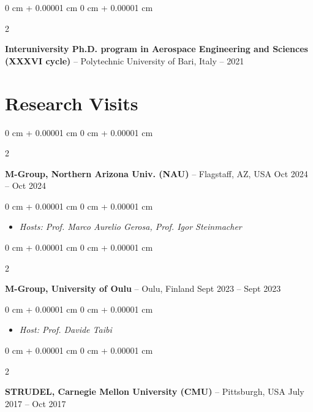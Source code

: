 \documentclass[10pt, a4paper]{article}
\newenvironment{highlights}{
    \begin{itemize}[
        topsep=0.10 cm,
        parsep=0.10 cm,
        partopsep=0pt,
        itemsep=0pt,
        leftmargin=0 cm + 10pt
    ]
}{
    \end{itemize}
} %
\newenvironment{onecolentry}{
    \begin{adjustwidth}{
        0 cm + 0.00001 cm
    }{
        0 cm + 0.00001 cm
    }
}{
    \end{adjustwidth}
} %
\newenvironment{twocolentry}[2][]{
    \onecolentry
    \def\secondColumn{#2}
    \setcolumnwidth{\fill, 4.5 cm}
    \begin{paracol}{2}
}{
    \switchcolumn \raggedleft \secondColumn
    \end{paracol}
    \endonecolentry
} %
\begin{document}
        \vspace{0.2 cm}

        \begin{twocolentry}{
            2020 – 2021
        }
            \textbf{Interuniversity Ph.D. program in Aerospace Engineering and Sciences (XXXVI cycle)} -- Polytechnic University of Bari, Italy\end{twocolentry}




    
    \section{Research Visits}



        
        \begin{twocolentry}{
            Oct 2024 – Oct 2024
        }
            \textbf{M-Group, Northern Arizona Univ. (NAU)} -- Flagstaff, AZ, USA\end{twocolentry}

        \vspace{0.10 cm}
        \begin{onecolentry}
            \begin{highlights}
                \item \textit{Hosts: Prof. Marco Aurelio Gerosa, Prof. Igor Steinmacher}
            \end{highlights}
        \end{onecolentry}


        \vspace{0.2 cm}

        \begin{twocolentry}{
            Sept 2023 – Sept 2023
        }
            \textbf{M-Group, University of Oulu} -- Oulu, Finland\end{twocolentry}

        \vspace{0.10 cm}
        \begin{onecolentry}
            \begin{highlights}
                \item \textit{Host: Prof. Davide Taibi}
            \end{highlights}
        \end{onecolentry}


        \vspace{0.2 cm}

        \begin{twocolentry}{
            July 2017 – Oct 2017
        }
            \textbf{STRUDEL, Carnegie Mellon University (CMU)} -- Pittsburgh, USA\end{twocolentry}
\end{document}
